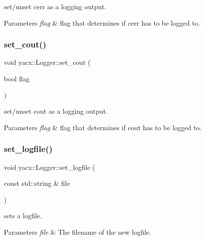 set/unset cerr as a logging output. 
\begin{DoxyParams}{Parameters}
{\em flag} & flag that determines if cerr has to be logged to. \\
\hline
\end{DoxyParams}
\mbox{\label{classyacx_1_1_logger_a3da3e41f4cb2ddec4c63b8225548ac89}} 
\subsubsection{\texorpdfstring{set\+\_\+cout()}{set\_cout()}}
{\footnotesize\ttfamily void yacx\+::\+Logger\+::set\+\_\+cout (\begin{DoxyParamCaption}\item[{bool}]{flag }\end{DoxyParamCaption})\hspace{0.3cm}{\ttfamily [inline]}}

set/unset cout as a logging output. 
\begin{DoxyParams}{Parameters}
{\em flag} & flag that determines if cout has to be logged to. \\
\hline
\end{DoxyParams}
\mbox{\label{classyacx_1_1_logger_a88b7b8dd9e533198ca879d3e7c0af5f0}} 
\subsubsection{\texorpdfstring{set\+\_\+logfile()}{set\_logfile()}}
{\footnotesize\ttfamily void yacx\+::\+Logger\+::set\+\_\+logfile (\begin{DoxyParamCaption}\item[{const std\+::string \&}]{file }\end{DoxyParamCaption})\hspace{0.3cm}{\ttfamily [inline]}}

sets a logfile. 
\begin{DoxyParams}{Parameters}
{\em file} & The filename of the new logfile. \\
\hline
\end{DoxyParams}
\mbox{\label{classyacx_1_1_logger_af33e8d52379eb2147a0b2ff51f7839c4}} 
